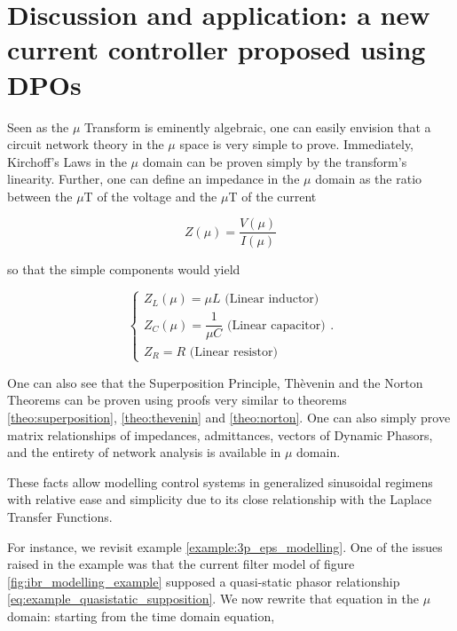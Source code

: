 \section{Discussion and application: a new current controller proposed using DPOs}\label{subsec:new_controller} %

	Seen as the $\mu$ Transform is eminently algebraic, one can easily envision that a circuit network theory in the $\mu$ space is very simple to prove. Immediately, Kirchoff's Laws in the $\mu$ domain can be proven simply by the transform's linearity. Further, one can define an impedance in the $\mu$ domain as the ratio between the $\mu$T of the voltage and the $\mu$T of the current

\begin{equation} Z\left(\mu\right) = \dfrac{V\left(\mu\right)}{I\left(\mu\right)} \end{equation}

	\noindent so that the simple components would yield 

\begin{equation}\left\{\begin{array}{l} Z_L\left(\mu\right) = \mu L \text{ (Linear inductor)}\\[3mm] Z_C\left(\mu\right) = \dfrac{1}{\mu C} \text{ (Linear capacitor)}\\[5mm] Z_R = R \text{ (Linear resistor)}\end{array} \right. .\label{sys:muT_impedances_formula}\end{equation}

	One can also see that the Superposition Principle, Thèvenin and the Norton Theorems can be proven using proofs very similar to theorems \ref{theo:superposition}, \ref{theo:thevenin} and \ref{theo:norton}. One can also simply prove matrix relationships of impedances, admittances, vectors of Dynamic Phasors, and the entirety of network analysis is available in $\mu$ domain.

	These facts allow modelling control systems in generalized sinusoidal regimens with relative ease and simplicity due to its close relationship with the Laplace Transfer Functions.

	For instance, we revisit example \ref{example:3p_eps_modelling}. One of the issues raised in the example was that the current filter model of figure \ref{fig:ibr_modelling_example} supposed a quasi-static phasor relationship \eqref{eq:example_quasistatic_supposition}. We now rewrite that equation in the $\mu$ domain: starting from the time domain equation,

